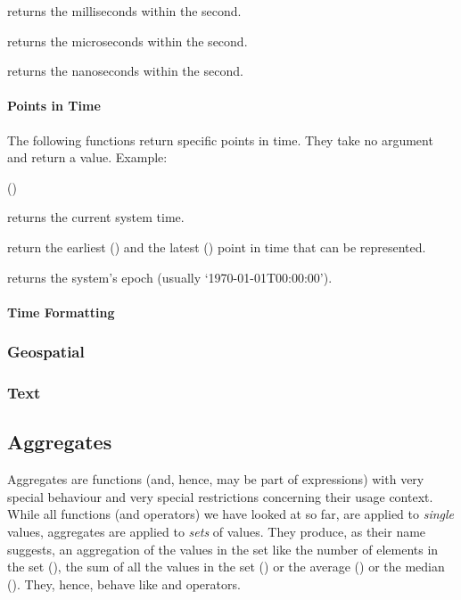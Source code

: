 returns the milliseconds within the second.

returns the microseconds within the second.

returns the nanoseconds within the second.

\paragraph{Points in Time}
The following functions return specific points in time.
They take no argument and return a  value.
Example:

 ()
 

returns the current system time.

return the earliest () and
the latest () point in time
that can be represented.

returns the system's epoch
(usually `1970-01-01T00:00:00').

\paragraph{Time Formatting}

\subsubsection{Geospatial}

\subsubsection{Text}

\subsection{Aggregates}\label{sec_agg}
Aggregates are functions (and, hence, may be part
of expressions) with very special behaviour and
very special restrictions concerning their usage
context.
While all functions (and operators) we have looked at
so far, are applied to \emph{single} values,
aggregates are applied
to \emph{sets} of values. They produce,
as their name suggests, an aggregation of the
values in the set like the number of elements
in the set (),
the sum of all the values in the set
() or the average ()
or the median ().
They, hence, behave like  and
 operators.

